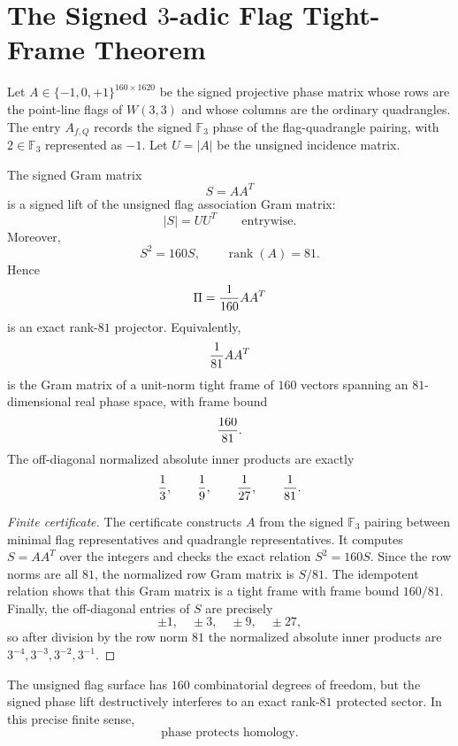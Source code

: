 
\section{The Signed $3$-adic Flag Tight-Frame Theorem}
\label{sec:signed-flag-tight-frame}

Let $A\in\{-1,0,+1\}^{160\times1620}$ be the signed projective phase matrix whose
rows are the point-line flags of $W(3,3)$ and whose columns are the ordinary
quadrangles.  The entry $A_{f,Q}$ records the signed $\mathbb F_3$ phase of the
flag-quadrangle pairing, with $2\in\mathbb F_3$ represented as $-1$.  Let
$U=|A|$ be the unsigned incidence matrix.

\begin{theorem}
The signed Gram matrix
\[
        S=AA^T
\]
is a signed lift of the unsigned flag association Gram matrix:
\[
        |S|=UU^T
        \qquad\text{entrywise.}
\]
Moreover,
\[
        S^2=160S,
        \qquad
        \operatorname{rank}(A)=81.
\]
Hence
\[
        \Pi={1\over160}AA^T
\]
is an exact rank-$81$ projector.  Equivalently,
\[
        {1\over81}AA^T
\]
is the Gram matrix of a unit-norm tight frame of $160$ vectors spanning an
$81$-dimensional real phase space, with frame bound
\[
        {160\over81}.
\]
The off-diagonal normalized absolute inner products are exactly
\[
        {1\over3},\qquad {1\over9},\qquad {1\over27},\qquad {1\over81}.
\]
\end{theorem}

\begin{proof}[Finite certificate]
The certificate constructs $A$ from the signed $\mathbb F_3$ pairing between minimal
flag representatives and quadrangle representatives.  It computes
$S=AA^T$ over the integers and checks the exact relation $S^2=160S$.  Since the row
norms are all $81$, the normalized row Gram matrix is $S/81$.  The idempotent
relation shows that this Gram matrix is a tight frame with frame bound $160/81$.
Finally, the off-diagonal entries of $S$ are precisely
\[
        \pm1,\quad \pm3,\quad \pm9,\quad \pm27,
\]
so after division by the row norm $81$ the normalized absolute inner products are
$3^{-4},3^{-3},3^{-2},3^{-1}$.
\end{proof}

\begin{corollary}
The unsigned flag surface has $160$ combinatorial degrees of freedom, but the signed
phase lift destructively interferes to an exact rank-$81$ protected sector.  In this
precise finite sense,
\[
        \text{phase protects homology.}
\]
\end{corollary}
